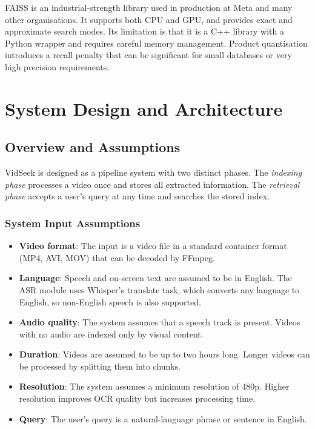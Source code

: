 \documentclass[12pt, a4paper]{report}
\begin{document}
FAISS is an industrial-strength library used in production at Meta and many
other organisations. It supports both CPU and GPU, and provides exact and
approximate search modes. Its limitation is that it is a C++ library with
a Python wrapper and requires careful memory management. Product quantisation
introduces a recall penalty that can be significant for small databases or
very high precision requirements.


\chapter{System Design and Architecture}

\section{Overview and Assumptions}

VidSeek is designed as a pipeline system with two distinct phases. The
\textit{indexing phase} processes a video once and stores all extracted
information. The \textit{retrieval phase} accepts a user's query at any
time and searches the stored index.

\subsection{System Input Assumptions}

\begin{itemize}
  \item \textbf{Video format}: The input is a video file in a standard
    container format (MP4, AVI, MOV) that can be decoded by FFmpeg.
  \item \textbf{Language}: Speech and on-screen text are assumed to be
    in English. The ASR module uses Whisper's translate task, which converts
    any language to English, so non-English speech is also supported.
  \item \textbf{Audio quality}: The system assumes that a speech track is
    present. Videos with no audio are indexed only by visual content.
  \item \textbf{Duration}: Videos are assumed to be up to two hours long.
    Longer videos can be processed by splitting them into chunks.
  \item \textbf{Resolution}: The system assumes a minimum resolution of
    480p. Higher resolution improves OCR quality but increases processing time.
  \item \textbf{Query}: The user's query is a natural-language phrase or
    sentence in English.
\end{itemize}
\end{document}
